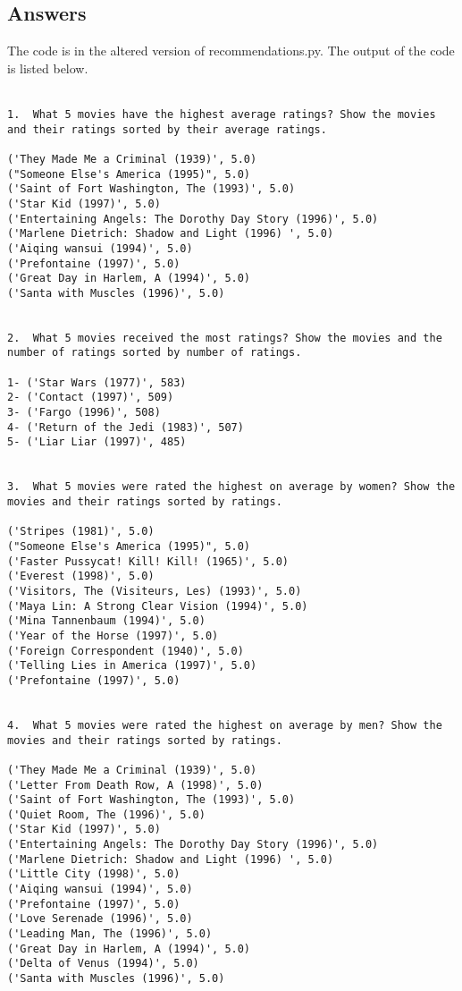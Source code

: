 \documentclass[letterpaper,11pt]{article}
\begin{document}
\subsection*{Answers}
The code is in the altered version of recommendations.py. The output of the code is listed below.
\\
\\
\begin{lstlisting}
1.  What 5 movies have the highest average ratings? Show the movies and their ratings sorted by their average ratings.

('They Made Me a Criminal (1939)', 5.0)
("Someone Else's America (1995)", 5.0)
('Saint of Fort Washington, The (1993)', 5.0)
('Star Kid (1997)', 5.0)
('Entertaining Angels: The Dorothy Day Story (1996)', 5.0)
('Marlene Dietrich: Shadow and Light (1996) ', 5.0)
('Aiqing wansui (1994)', 5.0)
('Prefontaine (1997)', 5.0)
('Great Day in Harlem, A (1994)', 5.0)
('Santa with Muscles (1996)', 5.0)


2.  What 5 movies received the most ratings? Show the movies and the number of ratings sorted by number of ratings.

1- ('Star Wars (1977)', 583)
2- ('Contact (1997)', 509)
3- ('Fargo (1996)', 508)
4- ('Return of the Jedi (1983)', 507)
5- ('Liar Liar (1997)', 485)


3.  What 5 movies were rated the highest on average by women? Show the movies and their ratings sorted by ratings.

('Stripes (1981)', 5.0)
("Someone Else's America (1995)", 5.0)
('Faster Pussycat! Kill! Kill! (1965)', 5.0)
('Everest (1998)', 5.0)
('Visitors, The (Visiteurs, Les) (1993)', 5.0)
('Maya Lin: A Strong Clear Vision (1994)', 5.0)
('Mina Tannenbaum (1994)', 5.0)
('Year of the Horse (1997)', 5.0)
('Foreign Correspondent (1940)', 5.0)
('Telling Lies in America (1997)', 5.0)
('Prefontaine (1997)', 5.0)


4.  What 5 movies were rated the highest on average by men? Show the movies and their ratings sorted by ratings.

('They Made Me a Criminal (1939)', 5.0)
('Letter From Death Row, A (1998)', 5.0)
('Saint of Fort Washington, The (1993)', 5.0)
('Quiet Room, The (1996)', 5.0)
('Star Kid (1997)', 5.0)
('Entertaining Angels: The Dorothy Day Story (1996)', 5.0)
('Marlene Dietrich: Shadow and Light (1996) ', 5.0)
('Little City (1998)', 5.0)
('Aiqing wansui (1994)', 5.0)
('Prefontaine (1997)', 5.0)
('Love Serenade (1996)', 5.0)
('Leading Man, The (1996)', 5.0)
('Great Day in Harlem, A (1994)', 5.0)
('Delta of Venus (1994)', 5.0)
('Santa with Muscles (1996)', 5.0)


\end{lstlisting}
\end{document}
